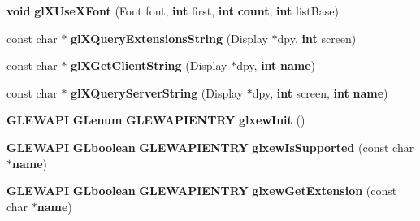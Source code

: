 \begin{DoxyCompactItemize}
{\bf void} {\bf gl\+X\+Use\+X\+Font} (Font font, {\bf int} first, {\bf int} {\bf count}, {\bf int} list\+Base)
\item 
const char $\ast$ {\bf gl\+X\+Query\+Extensions\+String} (Display $\ast$dpy, {\bf int} screen)
\item 
const char $\ast$ {\bf gl\+X\+Get\+Client\+String} (Display $\ast$dpy, {\bf int} {\bf name})
\item 
const char $\ast$ {\bf gl\+X\+Query\+Server\+String} (Display $\ast$dpy, {\bf int} screen, {\bf int} {\bf name})
\item 
{\bf G\+L\+E\+W\+A\+PI} {\bf G\+Lenum} {\bf G\+L\+E\+W\+A\+P\+I\+E\+N\+T\+RY} {\bf glxew\+Init} ()
\item 
{\bf G\+L\+E\+W\+A\+PI} {\bf G\+Lboolean} {\bf G\+L\+E\+W\+A\+P\+I\+E\+N\+T\+RY} {\bf glxew\+Is\+Supported} (const char $\ast${\bf name})
\item 
{\bf G\+L\+E\+W\+A\+PI} {\bf G\+Lboolean} {\bf G\+L\+E\+W\+A\+P\+I\+E\+N\+T\+RY} {\bf glxew\+Get\+Extension} (const char $\ast${\bf name})
\end{DoxyCompactItemize}
